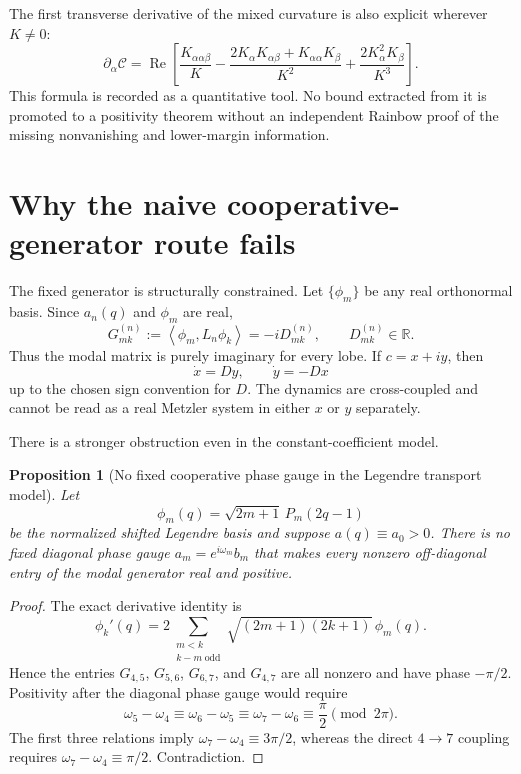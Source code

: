 \documentclass[11pt]{amsart}
\numberwithin{equation}{section}
\theoremstyle{plain}
\newtheorem{proposition}[theorem]{Proposition}
\theoremstyle{definition}
\theoremstyle{remark}
\newcommand{\R}{\mathbb R}
\newcommand{\Ccal}{\mathcal C}
\newcommand{\Ree}{\operatorname{Re}}
\newcommand{\ip}[2]{\left\langle #1,#2\right\rangle}
\begin{document}
The first transverse derivative of the mixed curvature is also explicit wherever $K\ne0$:
\begin{equation}
\boxed{
\partial_\alpha\Ccal
=\Ree\left[
\frac{K_{\alpha\alpha\beta}}{K}
-\frac{2K_\alpha K_{\alpha\beta}+K_{\alpha\alpha}K_\beta}{K^2}
+\frac{2K_\alpha^2K_\beta}{K^3}
\right].
}
\label{eq:C-alpha-derivative}
\end{equation}
This formula is recorded as a quantitative tool.  No bound extracted from it is promoted to a positivity theorem without an independent Rainbow proof of the missing nonvanishing and lower-margin information.

\section{Why the naive cooperative-generator route fails}
\label{sec:no-go}

The fixed generator is structurally constrained.  Let $\{\phi_m\}$ be any real orthonormal basis.  Since $a_n(q)$ and $\phi_m$ are real,
\begin{equation}
G_{mk}^{(n)}
:=\ip{\phi_m}{L_n\phi_k}
=-iD_{mk}^{(n)},
\qquad
D_{mk}^{(n)}\in\R.
\label{eq:Gimag}
\end{equation}
Thus the modal matrix is purely imaginary for every lobe.  If $c=x+iy$, then
\begin{equation}
\dot x=D y,
\qquad
\dot y=-D x
\end{equation}
up to the chosen sign convention for $D$.  The dynamics are cross-coupled and cannot be read as a real Metzler system in either $x$ or $y$ separately.

There is a stronger obstruction even in the constant-coefficient model.

\begin{proposition}[No fixed cooperative phase gauge in the Legendre transport model]
\label{prop:no-gauge}
Let
\begin{equation}
\phi_m(q)=\sqrt{2m+1}\,P_m(2q-1)
\end{equation}
be the normalized shifted Legendre basis and suppose $a(q)\equiv a_0>0$.  There is no fixed diagonal phase gauge $a_m=e^{i\omega_m}b_m$ that makes every nonzero off-diagonal entry of the modal generator real and positive.
\end{proposition}

\begin{proof}
The exact derivative identity is
\begin{equation}
\phi_k'(q)
=2\sum_{\substack{m<k\\k-m\;\mathrm{odd}}}
\sqrt{(2m+1)(2k+1)}\,\phi_m(q).
\label{eq:legendre-derivative}
\end{equation}
Hence the entries $G_{4,5}$, $G_{5,6}$, $G_{6,7}$, and $G_{4,7}$ are all nonzero and have phase $-\pi/2$.  Positivity after the diagonal phase gauge would require
\begin{equation}
\omega_5-\omega_4\equiv\omega_6-\omega_5\equiv\omega_7-\omega_6\equiv\frac\pi2\pmod{2\pi}.
\end{equation}
The first three relations imply $\omega_7-\omega_4\equiv3\pi/2$, whereas the direct $4\to7$ coupling requires $\omega_7-\omega_4\equiv\pi/2$.  Contradiction.
\end{proof}
\end{document}
